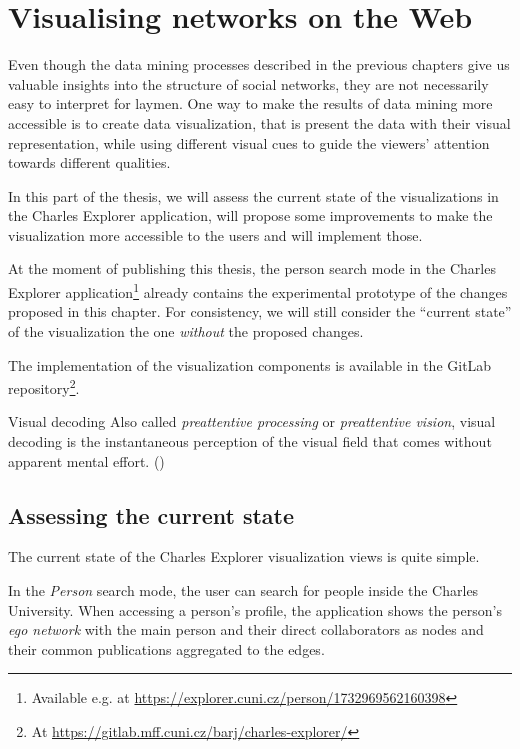 \chapter{Visualising networks on the Web}

Even though the data mining processes described in the previous chapters give us valuable insights into the structure of social networks, 
they are not necessarily easy to interpret for laymen.
One way to make the results of data mining more accessible is to create data visualization, that is present the data with their visual representation, 
while using different visual cues to guide the viewers' attention towards different qualities.

In this part of the thesis, we will assess the current state of the visualizations in the Charles Explorer application, 
will propose some improvements to make the visualization more accessible to the users and will implement those.

At the moment of publishing this thesis, the person search mode in the Charles Explorer application\footnote{Available e.g. at \url{https://explorer.cuni.cz/person/1732969562160398}} already contains the experimental prototype of the changes proposed in this chapter.
For consistency, we will still consider the ``current state'' of the visualization the one \textit{without} the proposed changes.

The implementation of the visualization components is available in the GitLab repository\footnote{At \url{https://gitlab.mff.cuni.cz/barj/charles-explorer/}}.

\begin{mybox}{Visual decoding}
    Also called \textit{preattentive processing} or \textit{preattentive vision}, visual decoding is the instantaneous perception of the visual field that comes without apparent mental effort. (\cite{Cleveland1985})
\end{mybox}

\section{Assessing the current state} \label{sec:current-state}

The current state of the Charles Explorer visualization views is quite simple. 

In the \textit{Person} search mode, the user can search for people inside the Charles University. 
When accessing a person's profile, the application shows the person's \textit{ego network} with the main person and their direct collaborators 
as nodes and their common publications aggregated to the edges.

